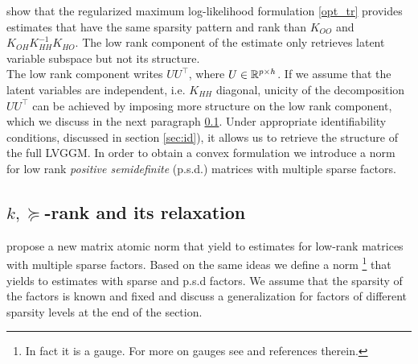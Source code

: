 \citet{chandrasekaran2010} show that the regularized maximum log-likelihood formulation \ref{opt_tr} provides estimates  that have the same sparsity pattern and rank than $K_{OO}$ and $K_{OH}K_{HH}^{-1}K_{HO}$. The low rank component of the estimate only retrieves latent variable subspace but not its structure.\\

The low rank component writes $UU^{\top}$, where $U\in\mathbb{R}^{p\times h}$. If we assume that the latent variables are independent, i.e. $K_{HH}$ diagonal,  unicity of the decomposition $UU^{\top}$ can be achieved by imposing more structure on the low rank component, which we discuss in the next paragraph \ref{subsec:norm}. Under appropriate identifiability conditions, discussed in section \ref{sec:id}), it allows us to retrieve the structure of the full LVGGM. In order to obtain a convex formulation we introduce a norm for low rank \textit{positive semidefinite} (p.s.d.) matrices with multiple sparse factors. 

 


%

\subsection{$k,\succeq$-rank and its relaxation}
\label{subsec:norm}

\citet{richard2014tight} propose a new matrix atomic norm that yield to estimates for low-rank matrices with multiple sparse factors. Based on the same ideas we define a norm \footnote{In fact it is a gauge. For more on gauges see \citet{chandrasekaran2010convex} and references therein.}  that yields to estimates with sparse and p.s.d factors. We assume that the sparsity of the factors is known and fixed and discuss a generalization for factors of different sparsity levels at the end of the section.


